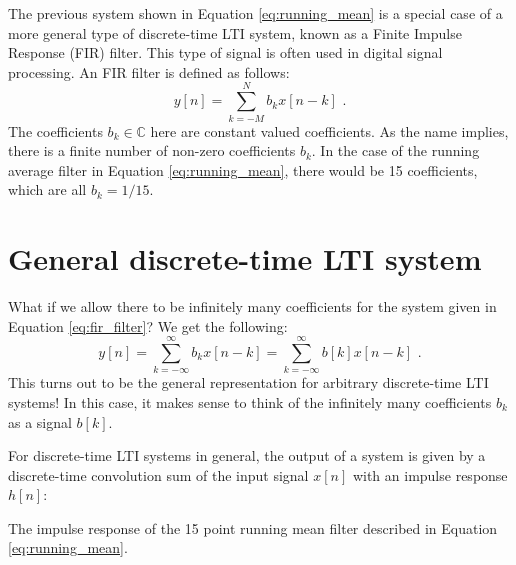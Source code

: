 The previous system shown in Equation \ref{eq:running_mean} is a special case of a 
more general type of discrete-time LTI system,
known as a Finite Impulse Response (FIR) filter. This type of signal is often 
used in digital signal processing.
An FIR filter is defined as follows:
\begin{equation}
  \boxed{
    y[n] = \sum_{k=-M}^{N} b_k x[n-k]\,\,.
  }
  \label{eq:fir_filter}
\end{equation}
The coefficients $b_k \in \mathbb{C}$ here are constant valued coefficients. 
As the name implies, there is a finite number of non-zero coefficients $b_k$.
In the case of the running average filter in Equation \ref{eq:running_mean}, 
there would be 15 coefficients, which are all $b_k=1/15$.

\section{General discrete-time LTI system}
What if we allow there to be infinitely many coefficients for the system given 
in Equation \ref{eq:fir_filter}? We get the following:
\begin{equation}
  y[n] = \sum_{k=-\infty}^{\infty} b_k x[n-k] = \sum_{k=-\infty}^{\infty} b[k] x[n-k]\,\,.
\end{equation}
This turns out to be the general representation for arbitrary discrete-time LTI systems! 
In this case, it makes sense to think of the infinitely many coefficients $b_k$ as a signal $b[k]$.

For discrete-time LTI systems in general, the output of a system is given by a discrete-time 
convolution sum of the input signal $x[n]$ with an impulse response $h[n]$:

\begin{marginfigure}
  \begin{center}
  \end{center}
  \caption{The impulse response of the 15 point running mean filter described in Equation \ref{eq:running_mean}.}
\end{marginfigure}

